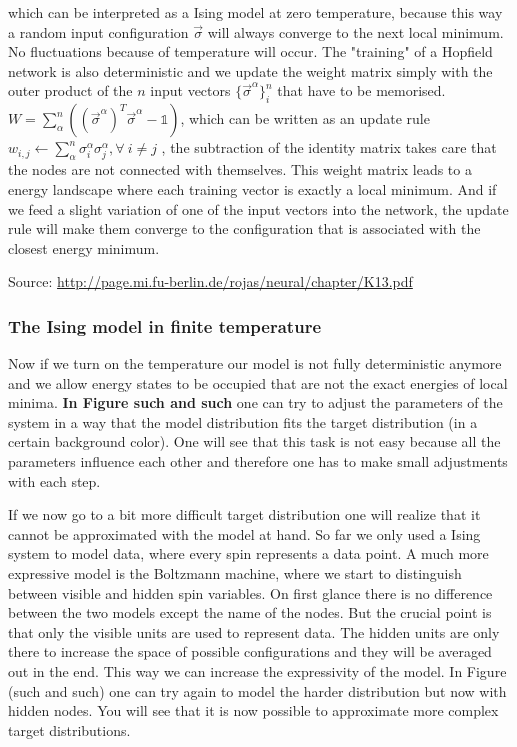 \documentclass[nofootinbib, superscriptaddress, prl]{revtex4}
\begin{document}
which can be interpreted as a Ising model at zero temperature, because this way a random input configuration $\vec{\sigma}$ will always converge to the next local minimum. No fluctuations because of temperature will occur. 
The "training" of a Hopfield network is also deterministic and we update the weight matrix simply with the outer product of the $n$ input vectors $\{ \vec{\sigma}^{\alpha}\}_i^n$ that have to be memorised. $W = \sum_{\alpha}^n( (\vec{\sigma}^{\alpha})^T \vec{\sigma}^{\alpha} - \mathbb{1}) $, which can be written as an update rule $w_{i,j} \leftarrow \sum_{\alpha}^n \sigma_i^{\alpha} \sigma_j^{\alpha}, \forall~i \neq j$
, the subtraction of the identity matrix takes care that the nodes are not connected with themselves.
This weight matrix leads to a energy landscape where each training vector is exactly a local minimum. And if we feed a slight variation of one of the input vectors into the network, the update rule will make them converge to the configuration that is associated with the closest energy minimum. 

Source: \url{http://page.mi.fu-berlin.de/rojas/neural/chapter/K13.pdf}

\subsubsection{The Ising model in finite temperature}

Now if we turn on the temperature our model is not fully deterministic anymore and we allow energy states to be occupied that are not the exact energies of local minima.
\textbf{In Figure such and such } one can try to adjust the parameters of the system in a way that the model distribution fits the target distribution (in a certain background color). One will see that this task is not easy because all the parameters influence each other and therefore one has to make small adjustments with each step.

If we now go to a bit more difficult target distribution one will realize that it cannot be approximated with the model at hand. So far we only used a Ising system to model data, where every spin represents a data point. A much more expressive model is the Boltzmann machine, where we start to distinguish between visible and hidden spin variables. On first glance there is no difference between the two models except the name of the nodes. But the crucial point is that only the visible units are used to represent data. The hidden units are only there to increase the space of possible configurations and they will be averaged out in the end. This way we can increase the expressivity of the model. In Figure (such and such) one can try again to model the harder distribution but now with hidden nodes. You will see that it is now possible to approximate more complex target distributions.
\end{document}
